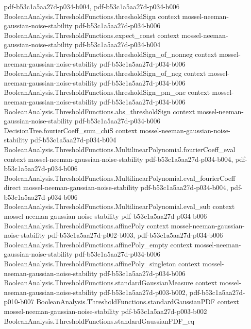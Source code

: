 \begin{theorem}
  {pdf-b53c1a5aa27d-p034-b004,
    pdf-b53c1a5aa27d-p034-b006}
\proofstep
  {BooleanAnalysis.ThresholdFunctions.thresholdSign}
  {context}
  {mossel-neeman-gaussian-noise-stability}
  {pdf-b53c1a5aa27d-p034-b006}
\proofstep
  {BooleanAnalysis.ThresholdFunctions.expect_const}
  {context}
  {mossel-neeman-gaussian-noise-stability}
  {pdf-b53c1a5aa27d-p034-b004}
\proofstep
  {BooleanAnalysis.ThresholdFunctions.thresholdSign_of_nonneg}
  {context}
  {mossel-neeman-gaussian-noise-stability}
  {pdf-b53c1a5aa27d-p034-b006}
\proofstep
  {BooleanAnalysis.ThresholdFunctions.thresholdSign_of_neg}
  {context}
  {mossel-neeman-gaussian-noise-stability}
  {pdf-b53c1a5aa27d-p034-b006}
\proofstep
  {BooleanAnalysis.ThresholdFunctions.thresholdSign_pm_one}
  {context}
  {mossel-neeman-gaussian-noise-stability}
  {pdf-b53c1a5aa27d-p034-b006}
\proofstep
  {BooleanAnalysis.ThresholdFunctions.abs_thresholdSign}
  {context}
  {mossel-neeman-gaussian-noise-stability}
  {pdf-b53c1a5aa27d-p034-b006}
\proofstep
  {DecisionTree.fourierCoeff_sum_chiS}
  {context}
  {mossel-neeman-gaussian-noise-stability}
  {pdf-b53c1a5aa27d-p034-b004}
\proofstep
  {BooleanAnalysis.ThresholdFunctions.MultilinearPolynomial.fourierCoeff_eval}
  {context}
  {mossel-neeman-gaussian-noise-stability}
  {pdf-b53c1a5aa27d-p034-b004,
    pdf-b53c1a5aa27d-p034-b006}
\proofstep
  {BooleanAnalysis.ThresholdFunctions.MultilinearPolynomial.eval_fourierCoeff}
  {direct}
  {mossel-neeman-gaussian-noise-stability}
  {pdf-b53c1a5aa27d-p034-b004,
    pdf-b53c1a5aa27d-p034-b006}
\proofstep
  {BooleanAnalysis.ThresholdFunctions.MultilinearPolynomial.eval_sub}
  {context}
  {mossel-neeman-gaussian-noise-stability}
  {pdf-b53c1a5aa27d-p034-b006}
\proofstep
  {BooleanAnalysis.ThresholdFunctions.affinePoly}
  {context}
  {mossel-neeman-gaussian-noise-stability}
  {pdf-b53c1a5aa27d-p002-b003,
    pdf-b53c1a5aa27d-p034-b006}
\proofstep
  {BooleanAnalysis.ThresholdFunctions.affinePoly_empty}
  {context}
  {mossel-neeman-gaussian-noise-stability}
  {pdf-b53c1a5aa27d-p034-b006}
\proofstep
  {BooleanAnalysis.ThresholdFunctions.affinePoly_singleton}
  {context}
  {mossel-neeman-gaussian-noise-stability}
  {pdf-b53c1a5aa27d-p034-b006}
\proofstep
  {BooleanAnalysis.ThresholdFunctions.standardGaussianMeasure}
  {context}
  {mossel-neeman-gaussian-noise-stability}
  {pdf-b53c1a5aa27d-p003-b002,
    pdf-b53c1a5aa27d-p010-b007}
\proofstep
  {BooleanAnalysis.ThresholdFunctions.standardGaussianPDF}
  {context}
  {mossel-neeman-gaussian-noise-stability}
  {pdf-b53c1a5aa27d-p003-b002}
\proofstep
  {BooleanAnalysis.ThresholdFunctions.standardGaussianPDF_eq}

\end{theorem}
